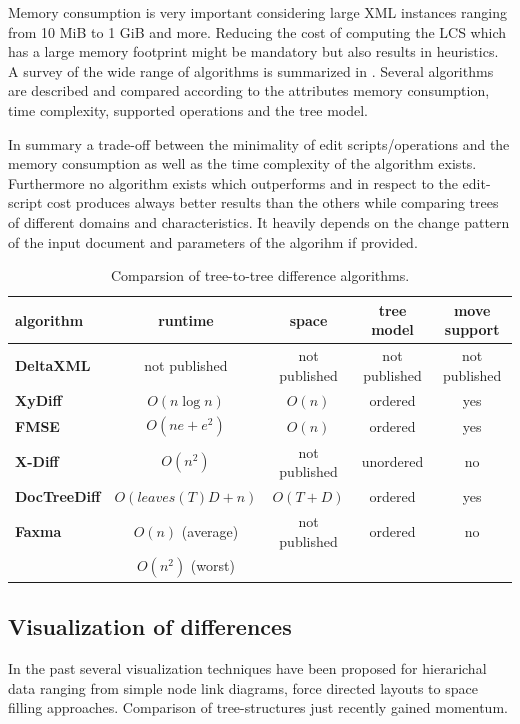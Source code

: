 Memory consumption is very important considering large XML instances ranging from 10 MiB to 1 GiB and more. Reducing the cost of computing the LCS which has a large memory footprint might be mandatory but also results in heuristics. A survey of the wide range of algorithms is summarized in \cite{cobena2002comparative}. Several algorithms are described and compared according to the attributes memory consumption, time complexity, supported operations and the tree model.

In summary a trade-off between the minimality of edit scripts/operations and the memory consumption as well as the time complexity of the algorithm exists. Furthermore no algorithm exists which outperforms and in respect to the edit-script cost produces always better results than the others while comparing trees of different domains and characteristics. It heavily depends on the change pattern of the input document and parameters of the algorihm if provided.

\begin{table}[tb]
\centering 
\begin{tabular}[r]{|l|c|c|c|c|} 
\hline
\textbf{algorithm} & \textbf{runtime} & \textbf{space} & \textbf{tree model} & \textbf{move support}\\
\hline
\hline
\textbf{DeltaXML} & not published & not published & not published & not published\\
\hline
\textbf{XyDiff} & $O(n \log n)$ & $O(n)$ & ordered & yes\\
\hline
\textbf{FMSE} & $O(n e + e^2)$ & $O(n)$ & ordered & yes\\
\hline
\textbf{X-Diff} & $O(n^2)$ & not published & unordered & no\\
\hline
\textbf{DocTreeDiff} & $O(leaves(T)D + n)$ & $O(T+D)$ & ordered & yes\\
\hline
\textbf{Faxma} & $O(n)$ (average) & not published & ordered & no\\
& $O(n^2)$ (worst) &  & & \\
\hline
\end{tabular}
\label{chap2:comparsion}
\vspace{0.5em} 
\caption{Comparsion of tree-to-tree difference algorithms.}
\end{table}

\subsection{Visualization of differences}
In the past several visualization techniques have been proposed for hierarichal data ranging from simple node link diagrams, force directed layouts to space filling approaches. Comparison of tree-structures just recently gained momentum. %

